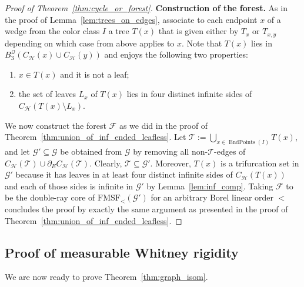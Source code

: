 \documentclass{article}
\theoremstyle{plain}
\theoremstyle{definition}
\newcommand{\cG}{\mathcal{G}}
\newcommand{\cF}{\mathcal{F}}
\newcommand{\cH}{\mathcal{H}}
\newcommand{\cT}{\mathcal{T}}
\begin{document}
\begin{proof}[Proof of Theorem~\ref{thm:cycle_or_forest}]
\textbf{Construction of the forest.} 
As in the proof of Lemma~\ref{lem:trees_on_edges}, associate to each endpoint $x$ of a wedge from the color class $I$ a tree $T(x)$ that is given either by $T_x$ or $T_{x,y}$ depending on which case from above applies to $x$. Note that $T(x)$ lies in $B_3^{\mathcal{Q}}(C_{\cH}(x)\cup C_{\cH}(y))$ and enjoys the following two properties:
     \begin{enumerate}
         \item $x\in T(x)$ and it is not a leaf;
         \item the set of leaves $L_x$ of $T(x)$ lies in four distinct infinite sides of $C_{\cH}(T(x)\setminus L_x)$. 
     \end{enumerate}

We now construct the forest $\cF$ as we did in the proof of Theorem~\ref{thm:union_of_inf_ended_leafless}. Let $\cT:=\bigcup_{x\in \operatorname{EndPoints}(I)} T(x)$, and let $\cG'\subseteq\cG$ be obtained from $\cG$ by removing all non-$\cT$-edges of $C_{\cH}(\cT)\cup \partial_E C_{\cH}(\cT)$. Clearly, $\cT\subseteq \cG'$. Moreover, $T(x)$ is a trifurcation set in $\cG'$ because it has leaves in at least four distinct infinite sides of $C_{\cH}(T(x))$ and each of those sides is infinite in $\cG'$ by Lemma~\ref{lem:inf_comp}. Taking $\cF$ to be the double-ray core of $\mathrm{FMSF}_{<}(\cG')$ for an arbitrary Borel linear order $<$ concludes the proof by exactly the same argument as presented in the proof of Theorem~\ref{thm:union_of_inf_ended_leafless}.
\end{proof}


\subsection{Proof of measurable Whitney rigidity}

We are now ready to prove Theorem~\ref{thm:graph_isom}.
\end{document}
